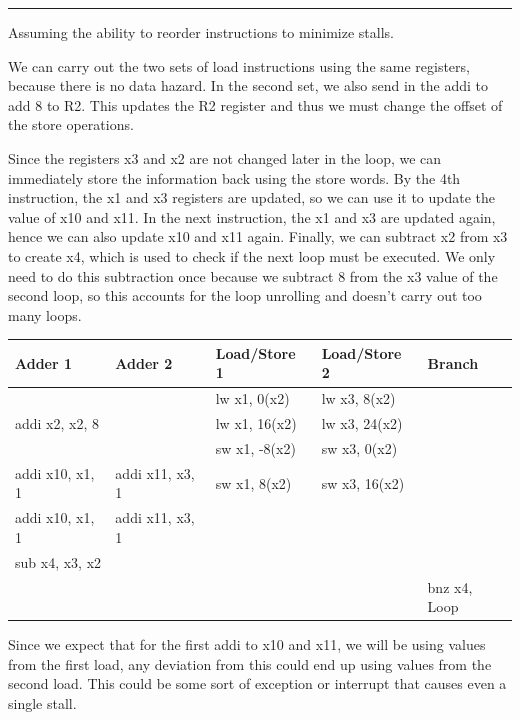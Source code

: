 \documentclass[11pt]{exam}
\newcounter{questionCounter}
\newcounter{partCounter}[questionCounter]
\newenvironment{namedquestion}[1]{%
    \addtocounter{questionCounter}{1}%
    \setcounter{partCounter}{0}%
    \vspace{.2in}%
        \noindent{\bf #1}%
    \vspace{0.3em} \hrule \vspace{.1in}%
}{}
\begin{document}
\begin{namedquestion}{Question 3.10}

Assuming the ability to reorder instructions to minimize stalls.

We can carry out the two sets of load instructions using the same registers, because there is no data hazard. In the second set, we also send in the addi to add 8 to R2. This updates the R2 register and thus we must change the offset of the store operations. 

Since the registers x3 and x2 are not changed later in the loop, we can immediately store the information back using the store words. By the 4th instruction, the x1 and x3 registers are updated, so we can use it to update the value of x10 and x11. In the next instruction, the x1 and x3 are updated again, hence we can also update x10 and x11 again. Finally, we can subtract x2 from x3 to create x4, which is used to check if the next loop must be executed. We only need to do this subtraction once because we subtract 8 from the x3 value of the second loop, so this accounts for the loop unrolling and doesn't carry out too many loops. \\

\begingroup
    \centering
    \def\arraystretch{1.5}
        \begin{tabular}{lllll}
            \toprule
            Adder 1 & Adder 2 & Load/Store 1 & Load/Store 2 & Branch \\
            \midrule
            && lw x1, 0(x2) &  lw x3, 8(x2)\\
            addi x2, x2, 8&& lw x1, 16(x2) & lw x3, 24(x2)\\
            && sw x1, -8(x2) & sw x3, 0(x2) \\
            addi x10, x1, 1& addi x11, x3, 1 & sw x1, 8(x2) & sw x3, 16(x2) \\
            addi x10, x1, 1& addi x11, x3, 1 &&\\
            sub x4, x3, x2 &&&\\
            &&&& bnz x4, Loop \\
            \bottomrule
        \end{tabular}
    \label{fig:cacheTable}
    \medskip
\endgroup

Since we expect that for the first addi to x10 and x11, we will be using values from the first load, any deviation from this could end up using values from the second load. This could be some sort of exception or interrupt that causes even a single stall. 



\end{namedquestion}
\end{document}
